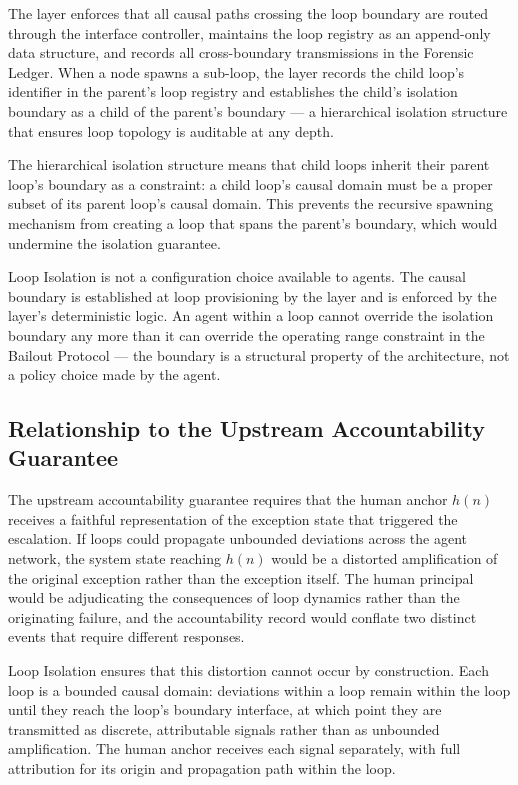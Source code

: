 The \fact{} layer enforces that all causal paths crossing the loop boundary are routed through the interface controller, maintains the loop registry as an append-only data structure, and records all cross-boundary transmissions in the Forensic Ledger. When a node spawns a sub-loop, the \fact{} layer records the child loop's identifier in the parent's loop registry and establishes the child's isolation boundary as a child of the parent's boundary — a hierarchical isolation structure that ensures loop topology is auditable at any depth.

The hierarchical isolation structure means that child loops inherit their parent loop's boundary as a constraint: a child loop's causal domain must be a proper subset of its parent loop's causal domain. This prevents the recursive spawning mechanism from creating a loop that spans the parent's boundary, which would undermine the isolation guarantee.

Loop Isolation is not a configuration choice available to agents. The causal boundary is established at loop provisioning by the \purpose{} layer and is enforced by the \fact{} layer's deterministic logic. An agent within a loop cannot override the isolation boundary any more than it can override the operating range constraint in the Bailout Protocol — the boundary is a structural property of the architecture, not a policy choice made by the agent.

\subsection{Relationship to the Upstream Accountability Guarantee}\label{sec:loop-uag}

The upstream accountability guarantee requires that the human anchor $h(n)$ receives a faithful representation of the exception state that triggered the escalation. If loops could propagate unbounded deviations across the agent network, the system state reaching $h(n)$ would be a distorted amplification of the original exception rather than the exception itself. The human principal would be adjudicating the consequences of loop dynamics rather than the originating failure, and the accountability record would conflate two distinct events that require different responses.

Loop Isolation ensures that this distortion cannot occur by construction. Each loop is a bounded causal domain: deviations within a loop remain within the loop until they reach the loop's boundary interface, at which point they are transmitted as discrete, attributable signals rather than as unbounded amplification. The human anchor receives each signal separately, with full attribution for its origin and propagation path within the loop.

